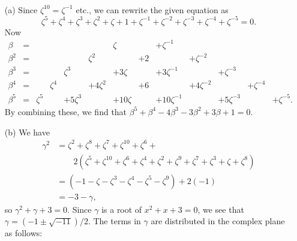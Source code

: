 \documentclass{amsart}
\newcommand{\bt}        {\beta}
\newcommand{\gm}        {\gamma}
\newcommand{\zt}        {\zeta}
\renewcommand{\:}{\colon}
\newenvironment{solution}{\SolutionInline}{\endSolutionInline}
\theoremstyle{definition}
\renewenvironment{solution}{\SolutionAtEnd}{\endSolutionAtEnd}
\begin{document}
\begin{solution}\ \\
 \begin{itemize}
  \item[(a)] 
   Since $\zt^{10}=\zt^{-1}$ etc., we can rewrite the given equation as
   \[ \zt^5+\zt^4+\zt^3+\zt^2+\zt+1 +
      \zt^{-1}+\zt^{-2}+\zt^{-3}+\zt^{-4}+\zt^{-5} = 0.
   \]
   Now 
   \[ \begin{array}{rrrrrrrrrrrrr}
       \bt   &= &&&&& \zt & & +\zt^{-1} &&&& \\
       \bt^2 &= &&&& \zt^2 & & + 2 & & +\zt^{-2} &&& \\
       \bt^3 &= &&& \zt^3 && +3\zt && +3\zt^{-1} && + \zt^{-3} && \\
       \bt^4 &= && \zt^4 && +4\zt^2 && +6 && +4\zt^{-2} && +\zt^{-4} &\\
       \bt^5 &= & \zt^5 && +5\zt^3 && +10\zt &&
                  +10\zt^{-1} && + 5\zt^{-3} && +\zt^{-5}.
      \end{array}
   \]
   By combining these, we find that $\bt^5+\bt^4-4\bt^3-3\bt^2+3\bt+1=0$.
  \item[(b)] We have
   \begin{align*}
    \gm^2 &= \zt^2+\zt^8+\zt^7+\zt^{10}+\zt^6+\\
     & \qquad 2(\zt^5+\zt^{10}+\zt^6+\zt^4+
                \zt^2+\zt^9+\zt^7+\zt^3+\zt+\zt^8)\\
     &= (-1-\zt-\zt^3-\zt^4-\zt^5-\zt^9)+2(-1)\\
     &= -3-\gm,
   \end{align*}
   so $\gm^2+\gm+3=0$.  Since $\gm$ is a root of $x^2+x+3=0$, we see
   that $\gm=(-1\pm\sqrt{-11})/2$.  The terms in $\gm$ are
   distributed in the complex plane as follows:
   \begin{center}
\end{center}
\end{itemize}
\end{solution}
\end{document}

